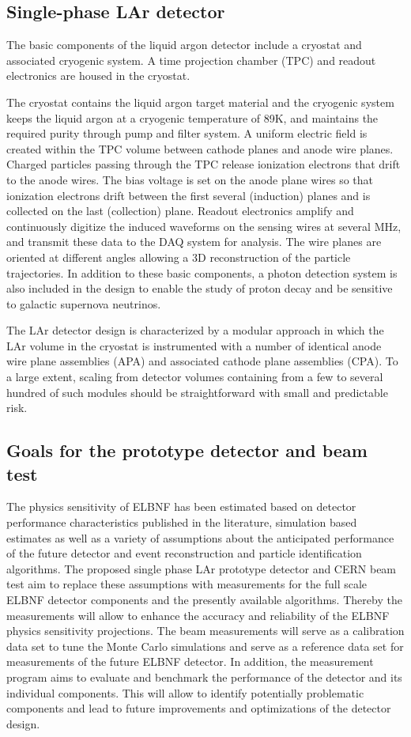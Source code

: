 \subsection{Single-phase LAr detector}

The basic components of the liquid argon detector include a cryostat and associated cryogenic system. A time projection chamber (TPC) and readout electronics are housed in the cryostat.

The cryostat contains the liquid argon target material and the cryogenic system keeps the liquid argon at a cryogenic temperature of 89K, and maintains the required purity through pump and filter system. A uniform electric field is created within the TPC volume between cathode planes and anode wire planes. Charged particles passing through the TPC release ionization electrons that drift to the anode wires. The bias voltage is set on the anode plane wires so that ionization electrons drift between the first several (induction) planes and is collected on the last (collection) plane. Readout electronics amplify and continuously digitize the induced waveforms on the sensing wires at several MHz, and transmit these data to the DAQ system for analysis. The wire planes are oriented at different angles allowing a 3D reconstruction of the particle trajectories. In addition to these basic components, a photon detection system is also included in the design to enable the study of proton decay and be sensitive to galactic supernova neutrinos.

The LAr detector design is characterized by a modular approach in which the LAr volume in the cryostat is instrumented with a number of identical anode wire plane assemblies (APA) and associated cathode plane assemblies (CPA). To a large extent, scaling from detector volumes containing from a few to several hundred of such modules should be straightforward with small and predictable risk.


\subsection{Goals for the prototype detector and beam test}

The physics sensitivity of ELBNF has been estimated based on detector performance characteristics published in the literature, simulation based estimates
as well as a variety of assumptions about the anticipated performance of the future detector and event reconstruction and particle identification algorithms.
The proposed single phase LAr prototype detector and CERN beam test aim to replace these assumptions with measurements for the full scale ELBNF detector 
components and the presently available algorithms. Thereby the measurements will allow to enhance the accuracy and reliability of the ELBNF physics sensitivity 
projections. The beam measurements will serve as a calibration data set to tune the Monte Carlo simulations and serve as a reference data set for measurements of the 
future ELBNF detector. In addition, the measurement program aims to evaluate and benchmark the performance of the detector and its individual components.
This will allow to identify potentially problematic components and lead to future improvements and optimizations of the detector design.


